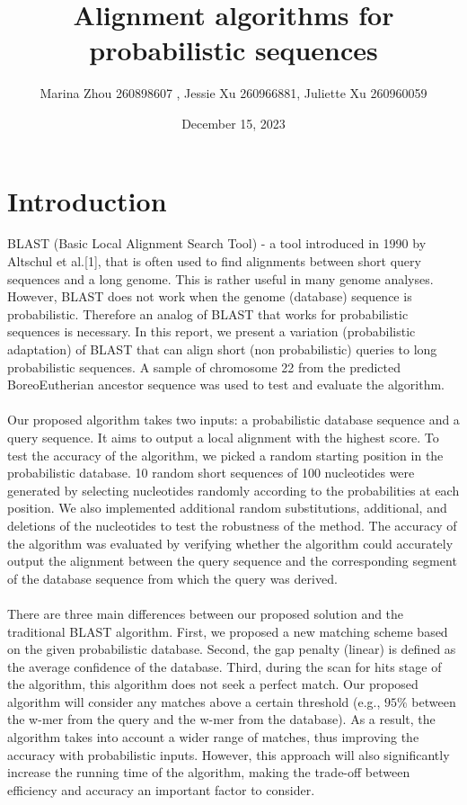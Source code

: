 \documentclass{article}
\title{Alignment	algorithms	for	probabilistic	sequences}
\author{Marina Zhou 260898607 , Jessie Xu 260966881, Juliette Xu 260960059}
\date{December 15, 2023}
\begin{document}
\maketitle

\section*{Introduction}
BLAST (Basic Local Alignment Search Tool) - a tool introduced in 1990 by Altschul et al.[1], that is often used to find alignments between short query sequences and a long genome. This is rather useful in many genome analyses. However, BLAST does not work when the genome (database) sequence is probabilistic. Therefore an analog of BLAST that works for probabilistic sequences is necessary. In this report, we present a variation (probabilistic adaptation) of BLAST that can align short (non probabilistic) queries to long probabilistic sequences. A sample of chromosome 22 from the predicted BoreoEutherian ancestor sequence was used to test and evaluate the algorithm. \\
\\
Our proposed algorithm takes two inputs: a probabilistic database sequence and a query sequence. It aims to output a local alignment with the highest score. To test the accuracy of the algorithm, we picked a random starting position in the probabilistic database. 10 random short sequences of 100 nucleotides were generated by selecting nucleotides randomly according to the probabilities at each position. We also implemented additional random substitutions, additional, and deletions of the nucleotides to test the robustness of the method. The accuracy of the algorithm was evaluated by verifying whether the algorithm could accurately output the alignment between the query sequence and the corresponding segment of the database sequence from which the query was derived.\\
\\
There are three main differences between our proposed solution and the traditional BLAST algorithm. First, we proposed a new matching scheme based on the given probabilistic database. Second, the gap penalty (linear) is defined as the average confidence of the database. Third, during the scan for hits stage of the algorithm, this algorithm does not seek a perfect match. Our proposed algorithm will consider any matches above a certain threshold (e.g., $95\%$ between the w-mer from the query and the w-mer from the database). As a result, the algorithm takes into account a wider range of matches, thus improving the accuracy with probabilistic inputs. However, this approach will also significantly increase the running time of the algorithm, making the trade-off between efficiency and accuracy an important factor to consider.\\
\end{document}
